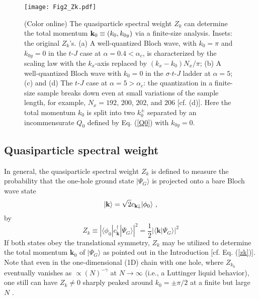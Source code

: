 \documentclass[aps,prb,twocolumn,notitlepage,superscriptaddress,showpacs]{revtex4-1}
\begin{document}
\begin{figure*}[tbp]
\begin{center}
\texttt{[image: Fig2\_Zk.pdf]}
\end{center}
\par
\renewcommand{\figurename}{Fig.}
\caption{(Color online) The quasiparticle spectral weight $Z_k$ can determine the total momentum ${\bf k}_0\equiv (k_0, k_{0y})$ via a finite-size analysis. Insets: the original $Z_k$'s. (a) A well-quantized Bloch wave, with $k_0=\pi$ and $k_{0y}=0$ in the $t$-$J$ case at $\alpha=0.4<\alpha_c$, is characterized by the scaling law with the $k_x$-axis replaced by $(k_x-k_0)N_x/\pi$; (b) A well-quantized Bloch wave with $k_0=0$ in the $\sigma$$\cdot$$t$-$J$ ladder at $\alpha=5$; (c) and (d) The $t$-$J$ case at $\alpha=5>\alpha_c$: the quantization in a finite-size sample breaks down even at small variations of the sample length, for example, $N_x=192$, $200$, $202$, and $206$ [cf. (d)]. Here the total momentum $k_0$ is split into two $k^{\pm}_0$ separated by an incommensurate $Q_0$ defined by Eq. (\ref{Q0}) with $k_{0y}=0$.
}
\label{Fig:Zk}
\end{figure*}


\subsection{Quasiparticle spectral weight}

In general, the quasiparticle spectral weight $Z_k$ is defined to measure the probability that the one-hole ground state $|\Psi_G \rangle$ is projected onto a bare Bloch wave state
\begin{equation}\label{Bloch}
|{\textbf{k}}\rangle=\sqrt{2} c_{{\textbf k}\downarrow}|\phi_0\rangle ~,
\end{equation}
by
\begin{equation}\label{zk1}
Z_k\equiv \left |\langle \phi_0|c^{\dagger}_{\textbf{k}}|\Psi_G \rangle \right |^2 =
\frac 1 2 \left |\langle {\textbf{k}}|\Psi_G \rangle \right |^2
\end{equation}
If both states obey the translational symmetry, $Z_{k}$ may be utilized to determine the total momentum ${ \textbf{k}}_0$ of $|\Psi_G \rangle$ as pointed out in the Introduction [cf. Eq. (\ref{zk})]. Note that even in the one-dimensional (1D) chain with one hole, where $Z_{k_0}$ eventually vanishes  as $\propto (N)^{-\gamma}$ at $N \rightarrow \infty$ (i.e., a Luttinger liquid behavior), one still can have $Z_{k}\neq 0$ sharply peaked around $k_0=\pm \pi/2$ at a finite but large $N$ \cite{Zhu2016}.
\end{document}

